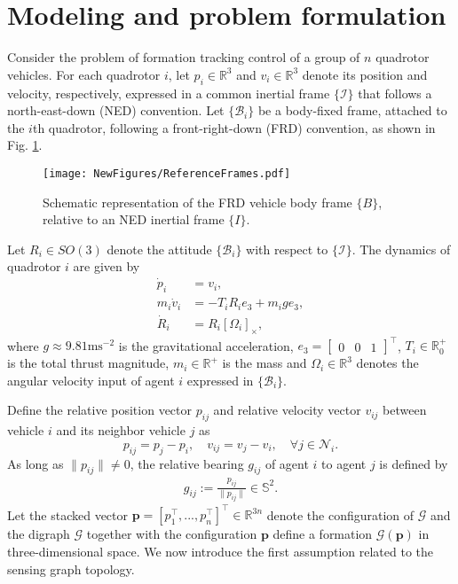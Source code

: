 \section{Modeling and problem formulation} \label{sec:modeling}
Consider the problem of formation tracking control of a group of $n$ quadrotor vehicles. For each quadrotor $i$, let $p_i\in \mathbb R^3$ and $v_i\in \mathbb R^3$ denote its position and velocity, respectively, expressed in a common inertial frame $\{\mathcal I\}$ that follows a north-east-down (NED) convention. Let $\{\mathcal B_i\}$ be a body-fixed frame, attached to the $i$th quadrotor, following a front-right-down (FRD) convention, as shown in Fig. \ref{fig:coordinates}.
\begin{figure}[t]
        \vspace{0.2cm}
	\centering
	\texttt{[image: NewFigures/ReferenceFrames.pdf]}
	\caption{Schematic representation of the FRD vehicle body frame $\{B\}$, relative to an NED inertial frame $\{I\}$.}
	\label{fig:coordinates}
\end{figure}
Let $R_i\in SO(3)$ denote the attitude $\{\mathcal B_i\}$ with respect to $\{\mathcal I\}$. The dynamics of quadrotor $i$ are given by
\begin{subequations}
    \label{eq:trans_dyn}
    \begin{align}
        \dot{p}_i &= v_i, \label{eq:dotp}\\
        m_i \dot{v}_i &= - T_i R_i e_3 + m_i g e_3, \label{eq:dotv} \\
         \dot{R}_i &= R_i {[\Omega_i]}_\times,\label{eq:dotR}
    \end{align}
\end{subequations}
where $g \approx 9.81\text{ms}^{-2}$ is the gravitational acceleration, $e_3 = \begin{bmatrix} 0 & 0 & 1\end{bmatrix}^\top$, $T_i\in \mathbb R_0^{+}$ is the total thrust magnitude, $m_i\in \mathbb R^{+}$ is the mass and $\Omega_i\in \mathbb R^3$ denotes the angular velocity input of agent $i$ expressed in $\{\mathcal B_i\}$.

Define the relative position vector $p_{ij}$ and relative velocity vector $v_{ij}$ between vehicle $i$ and its neighbor vehicle $j$ as 
$$p_{ij}=p_j-p_i, \quad v_{ij}=v_j-v_i, \quad \forall j\in \mathcal N_i.$$
As long as $\|p_{ij}\|\ne 0$, the relative bearing $g_{ij}$ of agent $i$ to agent $j$ is defined by
\begin{eqnarray}
    g_{ij} := \frac{p_{ij}}{\lVert p_{ij}\rVert} \in \mathbb S^2. \label{eq:bearing}
\end{eqnarray}
 Let the stacked vector $\boldsymbol{p}=[p_1^\top,...,p_n^\top]^\top\in \mathbb{R}^{3n}$ denote the configuration of $\mathcal{G}$ and the digraph $\mathcal{G}$ together with the configuration $\boldsymbol{p}$ define a formation $\mathcal{G}(\boldsymbol p)$ in three-dimensional space. We now introduce the first assumption related to the sensing graph topology.

